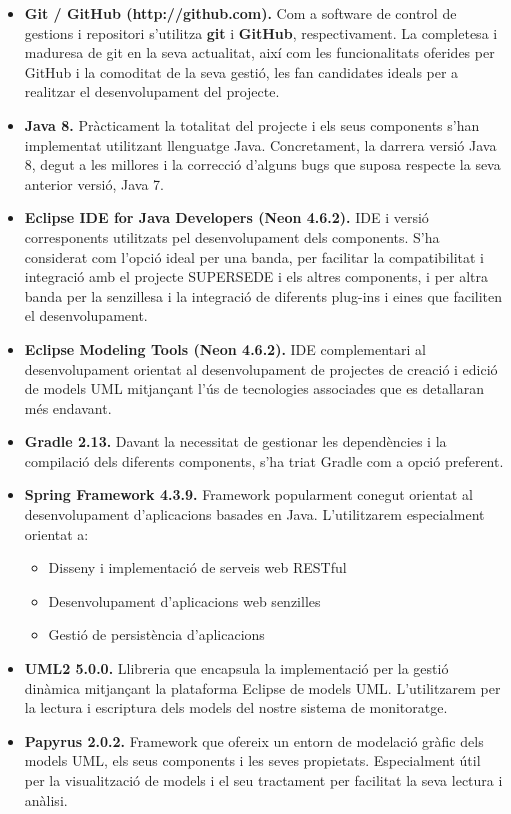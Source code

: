 \begin{itemize}
\item \textbf{Git / GitHub (http://github.com).} Com a software de control de gestions i repositori s'utilitza \textbf{git} i \textbf{GitHub}, respectivament. La completesa i maduresa de git en la seva actualitat, així com les funcionalitats oferides per GitHub i la comoditat de la seva gestió, les fan candidates ideals per a realitzar el desenvolupament del projecte.
\item \textbf{Java 8.} Pràcticament la totalitat del projecte i els seus components s'han implementat utilitzant llenguatge Java. Concretament, la darrera versió Java 8, degut a les millores i la correcció d'alguns bugs que suposa respecte la seva anterior versió, Java 7.
\item \textbf{Eclipse IDE for Java Developers (Neon 4.6.2).} IDE i versió corresponents utilitzats pel desenvolupament dels components. S'ha considerat com l'opció ideal per una banda, per facilitar la compatibilitat i integració amb el projecte SUPERSEDE i els altres components, i per altra banda per la senzillesa i la integració de diferents plug-ins i eines que faciliten el desenvolupament. 
\item \textbf{Eclipse Modeling Tools (Neon 4.6.2).}  IDE complementari al desenvolupament orientat al desenvolupament de projectes de creació i edició de models UML mitjançant l'ús de tecnologies associades que es detallaran més endavant. 
\item \textbf{Gradle 2.13.} Davant la necessitat de gestionar les dependències i la compilació dels diferents components, s'ha triat Gradle com a opció preferent.
\item \textbf{Spring Framework 4.3.9.} Framework popularment conegut orientat al desenvolupament d'aplicacions basades en Java. L'utilitzarem especialment orientat a:
\begin{itemize}
\item Disseny i implementació de serveis web RESTful
\item Desenvolupament d'aplicacions web senzilles
\item Gestió de persistència d'aplicacions
\end{itemize}
\item \textbf{UML2 5.0.0.} Llibreria que encapsula la implementació per la gestió dinàmica mitjançant la plataforma Eclipse de models UML. L'utilitzarem per la lectura i escriptura dels models del nostre sistema de monitoratge.
\item \textbf{Papyrus 2.0.2.} Framework que ofereix un entorn de modelació gràfic dels models UML, els seus components i les seves propietats. Especialment útil per la visualització de models i el seu tractament per facilitat la seva lectura i anàlisi.
\end{itemize}

